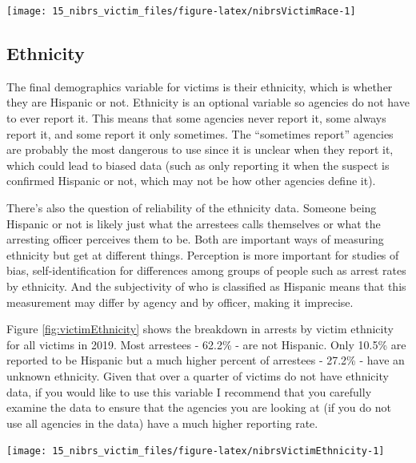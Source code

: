 \documentclass[
]{krantz}
\let\origfigure\figure
\let\endorigfigure\endfigure
\renewenvironment{figure}[1][2] {
    \expandafter\origfigure\expandafter[H]
} {
    \endorigfigure
}
\begin{document}
\begin{figure}

{\centering \texttt{[image: 15\_nibrs\_victim\_files/figure-latex/nibrsVictimRace-1]} 

}

\caption{The share of victims by race, 1991-2023.}\label{fig:nibrsVictimRace}
\end{figure}

\subsection{Ethnicity}\label{ethnicity-3}

The final demographics variable for victims is their
ethnicity, which is whether they are Hispanic or not.
Ethnicity is an optional variable so agencies do not have to
ever report it. This means that some agencies never report
it, some always report it, and some report it only
sometimes. The ``sometimes report'' agencies are probably
the most dangerous to use since it is unclear when they
report it, which could lead to biased data (such as only
reporting it when the suspect is confirmed Hispanic or not,
which may not be how other agencies define it).

There's also the question of reliability of the ethnicity
data. Someone being Hispanic or not is likely just what the
arrestees calls themselves or what the arresting officer
perceives them to be. Both are important ways of measuring
ethnicity but get at different things. Perception is more
important for studies of bias, self-identification for
differences among groups of people such as arrest rates by
ethnicity. And the subjectivity of who is classified as
Hispanic means that this measurement may differ by agency
and by officer, making it imprecise.

Figure \ref{fig:victimEthnicity} shows the breakdown in
arrests by victim ethnicity for all victims in 2019. Most
arrestees - 62.2\% - are not Hispanic. Only 10.5\% are
reported to be Hispanic but a much higher percent of
arrestees - 27.2\% - have an unknown ethnicity. Given that
over a quarter of victims do not have ethnicity data, if you
would like to use this variable I recommend that you
carefully examine the data to ensure that the agencies you
are looking at (if you do not use all agencies in the data)
have a much higher reporting rate.

\begin{figure}

{\centering \texttt{[image: 15\_nibrs\_victim\_files/figure-latex/nibrsVictimEthnicity-1]} 

}

\caption{The share of victims by ethnicity, 1991-2023.}\label{fig:nibrsVictimEthnicity}
\end{figure}
\end{document}
